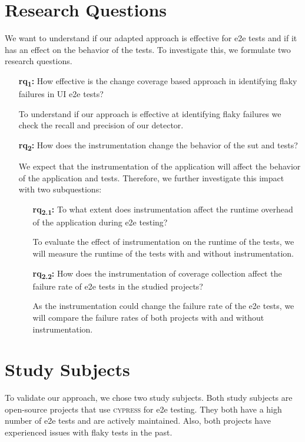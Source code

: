 \section{Research Questions}
We want to understand if our adapted approach is effective for \ac{e2e} tests and if it has an effect on the behavior of the tests.
To investigate this, we formulate two research questions.
\begin{enumerate}
	\item[\textbf{\acs{rq}\textsubscript{1}:}] How effective is the change coverage based approach in identifying flaky failures in UI \ac{e2e} tests?

		To understand if our approach is effective at identifying flaky failures we check the recall and precision of our detector.
	\item[\textbf{\acs{rq}\textsubscript{2}:}] How does the instrumentation change the behavior of the \ac{sut} and tests?

		We expect that the instrumentation of the application will affect the behavior of the application and tests.
		Therefore, we further investigate this impact with two subquestions:
		\begin{enumerate}
			\item[\textbf{\acs{rq}\textsubscript{2.1}:}] To what extent does instrumentation affect the runtime overhead of the application during \acs{e2e} testing?

				To evaluate the effect of instrumentation on the runtime of the tests, we will measure the runtime of the tests with and without instrumentation.
			\item[\textbf{\acs{rq}\textsubscript{2.2}:}] How does the instrumentation of coverage collection affect the failure rate of \ac{e2e} tests in the studied projects?

				As the instrumentation could change the failure rate of the \ac{e2e} tests, we will compare the failure rates of both projects with and without instrumentation.
		\end{enumerate}
\end{enumerate}

\section{Study Subjects}
To validate our approach, we chose two study subjects.
Both study subjects are open-source projects that use \textsc{cypress} for \ac{e2e} testing.
They both have a high number of \ac{e2e} tests and are actively maintained.
Also, both projects have experienced issues with flaky tests in the past.

